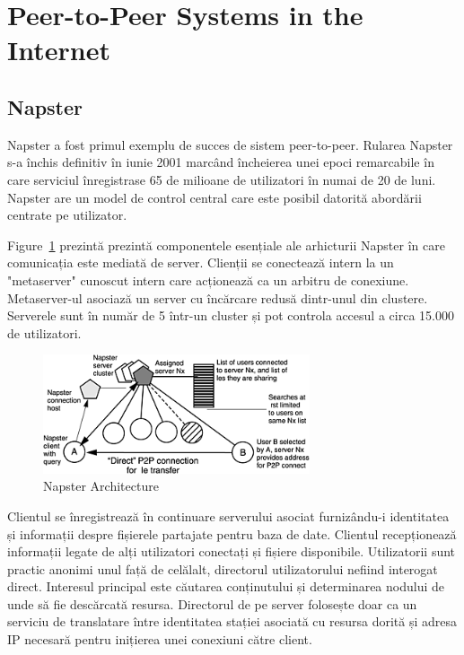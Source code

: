 \section{Peer-to-Peer Systems in the Internet}
\label{sec:p2p-systems:p2p-internet}

\subsection{Napster}

Napster a fost primul exemplu de succes de sistem peer-to-peer. Rularea
Napster s-a închis definitiv în iunie 2001 marcând încheierea unei epoci
remarcabile în care serviciul înregistrase 65 de milioane de utilizatori în
numai de 20 de luni. Napster are un model de control central care este posibil
datorită abordării centrate pe utilizator.

Figure~\ref{fig:p2p-systems:napster} prezintă prezintă componentele esențiale
ale arhicturii Napster în care comunicația este mediată de server. Clienții se
conectează intern la un "metaserver" cunoscut intern care acționează ca un
arbitru de conexiune. Metaserver-ul asociază un server cu încărcare redusă
dintr-unul din clustere. Serverele sunt în număr de 5 într-un cluster și pot
controla accesul a circa 15.000 de utilizatori.

\begin{figure}
  \centering
  \includegraphics[width=0.7\textwidth]{src/img/p2p-systems/napster}
  \caption{Napster Architecture}
  \label{fig:p2p-systems:napster}
\end{figure}

Clientul se înregistrează în continuare serverului asociat furnizându-i
identitatea și informații despre fișierele partajate pentru baza de date.
Clientul recepționează informații legate de alți utilizatori conectați și
fișiere disponibile. Utilizatorii sunt practic anonimi unul față de celălalt,
directorul utilizatorului nefiind interogat direct. Interesul principal este
căutarea conținutului și determinarea nodului de unde să fie descărcată
resursa. Directorul de pe server folosește doar ca un serviciu de translatare
între identitatea stației asociată cu resursa dorită și adresa IP necesară
pentru inițierea unei conexiuni către client.

